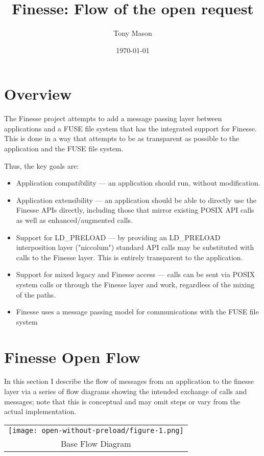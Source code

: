 \documentclass[a4paper,11pt]{article}
\title{Finesse: Flow of the open request}
\author{Tony Mason}
\date{\today}
\begin{document}
\maketitle

\section{Overview}\label{sec:overview}

The Finesse project attempts to add a message passing layer between applications and a FUSE file system that has the integrated support for Finesse.  This is done in a way that attempts to be as transparent as possible to the application and the FUSE file system.

Thus, the key goals are:

\begin{itemize}
    \item Application compatibility --- an application should run, without modification.
    \item Application extensibility --- an application should be able to directly use the Finesse APIs directly, including those that mirror existing POSIX API calls as well as enhanced/augmented calls.
    \item Support for LD\_PRELOAD --- by providing an LD\_PRELOAD interposition layer ("niccolum") standard API calls may be substituted with calls to the Finesse layer.  This is entirely transparent to the application.
    \item Support for mixed legacy and Finesse access --- calls can be sent via POSIX system calls or through the Finesse layer and work, regardless of the mixing of the paths.
    \item Finesse uses a message passing model for communications with the FUSE file system
\end{itemize}

\section{Finesse Open Flow}

In this section I describe the flow of messages from an application to the finesse layer via a series of flow diagrams showing the intended exchange of calls and messages; note that this is conceptual and may omit steps or vary from the actual implementation.

\begin{tabular}{c}
    \texttt{[image: open-without-preload/figure-1.png]}
    \tabularnewline
    Base Flow Diagram
\end{tabular}
\end{document}
